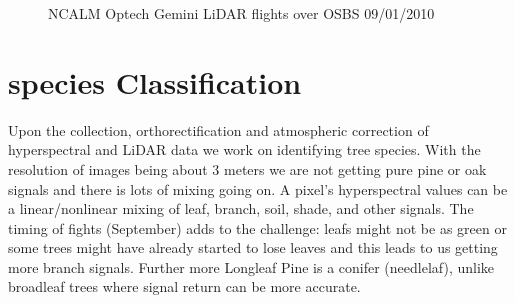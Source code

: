 \documentclass[remotesensing,article,accept,moreauthors,pdftex,12pt,a4paper]{mdpi}
\begin{document}
\begin{figure}[tp]
  \centering
  \hspace{3em}%
   \caption{NCALM Optech Gemini LiDAR flights over OSBS 09/01/2010 \cite{neon2010aopdatarelease}}
 \label{fig:lidar}
\end{figure}



\section{species Classification}

Upon the collection, orthorectification and atmospheric correction of hyperspectral and LiDAR data we work on identifying tree species. With the resolution of images being about 3 meters we are not getting pure pine or oak signals and there is lots of mixing going on. A pixel's hyperspectral values can be a linear/nonlinear mixing of leaf, branch, soil, shade, and other signals. The timing of fights (September) adds to the challenge: leafs might not be as green or some trees might have already started to lose leaves and this leads to us getting more branch signals. Further more Longleaf Pine is a conifer (needlelaf), unlike broadleaf trees where signal return can be more accurate. 
\end{document}
